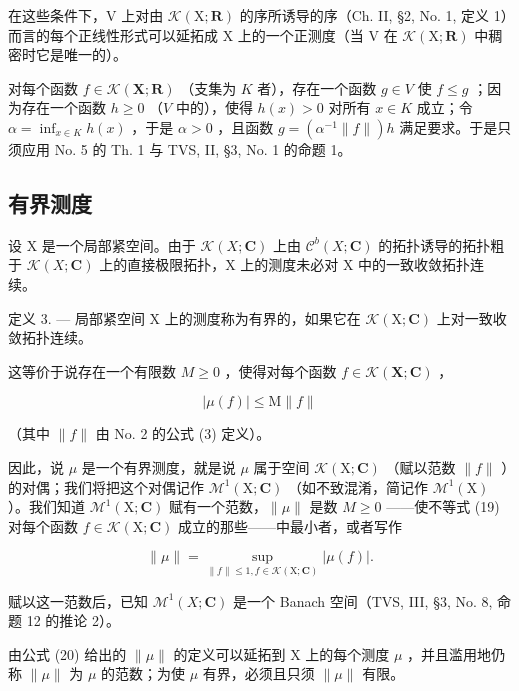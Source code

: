 在这些条件下，V 上对由 \(\mathcal{K}(\mathrm{X};\mathbf{R})\) 的序所诱导的序（Ch. II, §2, No. 1, 定义 1）而言的每个正线性形式可以延拓成 X 上的一个正测度（当 V 在 \(\mathcal{K}(\mathrm{X};\mathbf{R})\) 中稠密时它是唯一的）。

对每个函数 \(f \in \mathcal{K}(\mathbf{X};\mathbf{R})\) （支集为 \(K\) 者），存在一个函数 \(g \in V\) 使 \(f \leqslant g\) ；因为存在一个函数 \(h \geqslant 0\) （\(V\) 中的），使得 \(h(x) > 0\) 对所有 \(x \in K\) 成立；令 \(\alpha = \inf_{x \in K} h(x)\) ，于是 \(\alpha > 0\) ，且函数 \(g = (\alpha^{-1} \|f\|)h\) 满足要求。于是只须应用 No. 5 的 Th. 1 与 TVS, II, §3, No. 1 的命题 1。

\subsection{有界测度}

设 X 是一个局部紧空间。由于 \(\mathcal{K}(X;\mathbf{C})\) 上由 \(\mathcal{C}^{b}(X;\mathbf{C})\) 的拓扑诱导的拓扑粗于 \(\mathcal{K}(X;\mathbf{C})\) 上的直接极限拓扑，X 上的测度未必对 X 中的一致收敛拓扑连续。

定义 3. --- 局部紧空间 X 上的测度称为有界的，如果它在 \(\mathcal{K}(\mathrm{X};\mathbf{C})\) 上对一致收敛拓扑连续。

这等价于说存在一个有限数 \(M \geqslant 0\) ，使得对每个函数 \(f \in \mathcal{K}(\mathbf{X}; \mathbf{C})\) ，

\[
| \mu (f) | \leqslant \mathrm{M} \| f \|\tag{19}
\]

（其中 \(\| f\|\) 由 No. 2 的公式 (3) 定义）。

因此，说 \(\mu\) 是一个有界测度，就是说 \(\mu\) 属于空间 \(\mathcal{K}(\mathrm{X};\mathbf{C})\) （赋以范数 \(\| f\|\) ）的对偶；我们将把这个对偶记作 \(\mathcal{M}^1 (\mathrm{X};\mathbf{C})\) （如不致混淆，简记作 \(\mathcal{M}^1 (\mathrm{X})\) ）。我们知道 \(\mathcal{M}^1 (\mathrm{X};\mathbf{C})\) 赋有一个范数，\(\| \mu \|\) 是数 \(M\geqslant 0\) ——使不等式 (19) 对每个函数 \(f\in \mathcal{K}(\mathrm{X};\mathbf{C})\) 成立的那些——中最小者，或者写作

\[
\| \mu \| = \sup _ {\| f \| \leqslant 1, f \in \mathcal{K} (\mathrm{X}; \mathbf {C})} | \mu (f) |.\tag{20}
\]

赋以这一范数后，已知 \(\mathcal{M}^{1}(X;\mathbf{C})\) 是一个 Banach 空间（TVS, III, §3, No. 8, 命题 12 的推论 2）。

由公式 (20) 给出的 \(\|\mu\|\) 的定义可以延拓到 X 上的每个测度 \(\mu\) ，并且滥用地仍称 \(\|\mu\|\) 为 \(\mu\) 的范数；为使 \(\mu\) 有界，必须且只须 \(\|\mu\|\) 有限。

